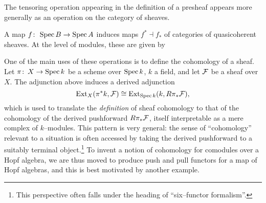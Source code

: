 The tensoring operation appearing in the definition of a presheaf appears more generally as an operation on the category of sheaves.

\begin{definition}\label{PushAndPullForQCohOnAffines}
A map \(f\colon\thinspace \operatorname{Spec} B \to \operatorname{Spec} A\) induces maps \(f^* \dashv f_*\) of categories of quasicoherent sheaves.  At the level of modules, these are given by
\begin{center}
\end{center}
\end{definition}

One of the main uses of these operations is to define the cohomology of a sheaf.  Let \(\pi\colon\thinspace X \to \operatorname{Spec} k\) be a scheme over \(\operatorname{Spec} k\), \(k\) a field, and let \(\mathcal{F}\) be a sheaf over \(X\).  The adjunction above induces a derived adjunction \[\operatorname{Ext}_X(\pi^* k, \mathcal{F}) \cong \operatorname{Ext}_{\operatorname{Spec} k}(k, R\pi_* \mathcal{F}),\] which is used to translate the \emph{definition} of sheaf cohomology to that of the cohomology of the derived pushforward \(R\pi_* \mathcal{F}\), itself interpretable as a mere complex of \(k\)--modules.  This pattern is very general: the sense of ``cohomology'' relevant to a situation is often accessed by taking the derived pushforward to a suitably terminal object.\footnote{This perspective often falls under the heading of ``six--functor formalism''.}  To invent a notion of cohomology for comodules over a Hopf algebra, we are thus moved to produce push and pull functors for a map of Hopf algebras, and this is best motivated by another example.

